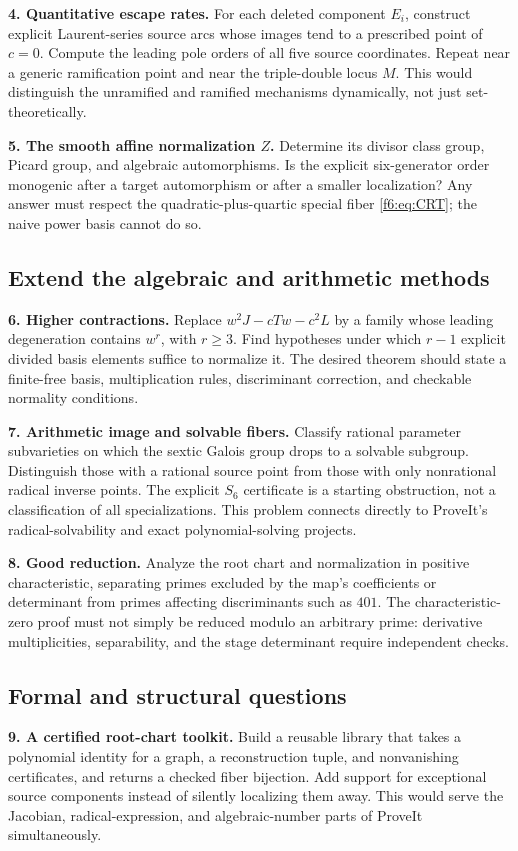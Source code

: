 \documentclass[11pt,a4paper]{article}
\theoremstyle{definition}
\begin{document}
\textbf{4. Quantitative escape rates.} For each deleted component $E_i$,
construct explicit Laurent-series source arcs whose images tend to a
prescribed point of $c=0$. Compute the leading pole orders of all five
source coordinates. Repeat near a generic ramification point and near
the triple-double locus $M$. This would distinguish the unramified and
ramified mechanisms dynamically, not just set-theoretically.

\textbf{5. The smooth affine normalization $Z$.} Determine its divisor
class group, Picard group, and algebraic automorphisms. Is the explicit
six-generator order monogenic after a target automorphism or after a
smaller localization? Any answer must respect the quadratic-plus-quartic
special fiber \eqref{f6:eq:CRT}; the naive power basis cannot do so.

\subsection{Extend the algebraic and arithmetic methods}
\textbf{6. Higher contractions.} Replace $w^2J-cTw-c^2L$ by a family
whose leading degeneration contains $w^r$, with $r\ge3$. Find hypotheses
under which $r-1$ explicit divided basis elements suffice to normalize
it. The desired theorem should state a finite-free basis, multiplication
rules, discriminant correction, and checkable normality conditions.

\textbf{7. Arithmetic image and solvable fibers.} Classify rational
parameter subvarieties on which the sextic Galois group drops to a
solvable subgroup. Distinguish those with a rational source point from
those with only nonrational radical inverse points. The explicit $S_6$
certificate is a starting obstruction, not a classification of all
specializations. This problem connects directly to ProveIt's
radical-solvability and exact polynomial-solving projects.

\textbf{8. Good reduction.} Analyze the root chart and normalization in
positive characteristic, separating primes excluded by the map's
coefficients or determinant from primes affecting discriminants such as
$401$. The characteristic-zero proof must not simply be reduced modulo
an arbitrary prime: derivative multiplicities, separability, and the
stage determinant require independent checks.

\subsection{Formal and structural questions}
\textbf{9. A certified root-chart toolkit.} Build a reusable library that
takes a polynomial identity for a graph, a reconstruction tuple, and
nonvanishing certificates, and returns a checked fiber bijection. Add
support for exceptional source components instead of silently localizing
them away. This would serve the Jacobian, radical-expression, and
algebraic-number parts of ProveIt simultaneously.
\end{document}
